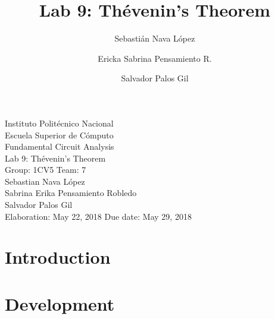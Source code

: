 \documentclass[letterpaper]{article}
\title{Lab 9: Thévenin's Theorem}
\author{
    Sebastián Nava López\\
    \and
    Ericka Sabrina Pensamiento R.\\
    \and
    Salvador Palos Gil
}
\begin{document}
\begin{titlepage}
    \centering
    {\Huge Instituto Politécnico Nacional}\\[3ex]
    {\huge Escuela Superior de Cómputo}\\[8ex]
    {\huge Fundamental Circuit Analysis}\\[12ex]
    {\Large Lab 9: Thévenin's Theorem}\\[20ex]
    {\Large Group: 1CV5 Team: 7 \\[8ex]
    Sebastian Nava López\\[4ex]
    Sabrina Erika Pensamiento Robledo\\[4ex]
    Salvador Palos Gil\\[18ex]
    }
    \large{Elaboration: May 22, 2018\hspace{8em} Due date: May 29, 2018}
\end{titlepage}
\tableofcontents
\newpage
\section{Introduction}
\newpage
\section{Development}
\end{document}
